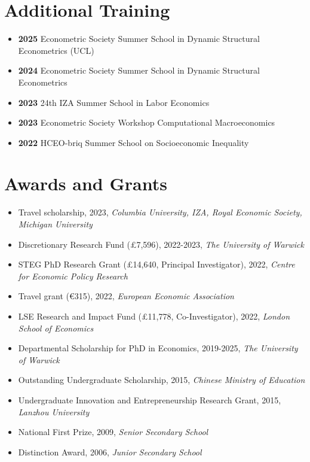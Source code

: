 \documentclass[11pt,a4paper]{article}
\begin{document}
\section{Additional Training}
\begin{itemize}[leftmargin=*, itemsep=0.2em, label={}]
    \item \textbf{2025} \quad Econometric Society Summer School in Dynamic Structural Econometrics (UCL)
    \item \textbf{2024} \quad Econometric Society Summer School in Dynamic Structural Econometrics
    \item \textbf{2023} \quad 24th IZA Summer School in Labor Economics
    \item \textbf{2023} \quad Econometric Society Workshop Computational Macroeconomics
    \item \textbf{2022} \quad HCEO-briq Summer School on Socioeconomic Inequality
\end{itemize}

\section{Awards and Grants}
\begin{itemize}[leftmargin=*, itemsep=0.2em]
    \item Travel scholarship, 2023, \textit{Columbia University, IZA, Royal Economic Society, Michigan University}
    \item Discretionary Research Fund (£7,596), 2022-2023, \textit{The University of Warwick}
    \item STEG PhD Research Grant (£14,640, Principal Investigator), 2022, \textit{Centre for Economic Policy Research}
    \item Travel grant (€315), 2022, \textit{European Economic Association}
    \item LSE Research and Impact Fund (£11,778, Co-Investigator), 2022, \textit{London School of Economics}
    \item Departmental Scholarship for PhD in Economics, 2019-2025, \textit{The University of Warwick}
    \item Outstanding Undergraduate Scholarship, 2015, \textit{Chinese Ministry of Education}
    \item Undergraduate Innovation and Entrepreneurship Research Grant, 2015, \textit{Lanzhou University}
    \item National First Prize, 2009, \textit{Senior Secondary School}
    \item Distinction Award, 2006, \textit{Junior Secondary School}
\end{itemize}
\end{document}
